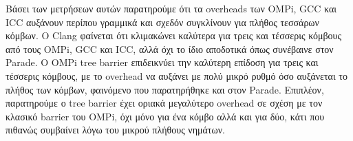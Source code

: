 Βάσει των μετρήσεων αυτών παρατηρούμε ότι τα overheads των OMPi, GCC και ICC αυξάνουν περίπου γραμμικά και σχεδόν συγκλίνουν για πλήθος τεσσάρων κόμβων. Ο Clang φαίνεται ότι κλιμακώνει καλύτερα για τρεις και τέσσερις κόμβους από τους OMPi, GCC και ICC, αλλά όχι το ίδιο αποδοτικά όπως συνέβαινε στον Parade. Ο OMPi tree barrier επιδεικνύει την καλύτερη επίδοση για τρεις και τέσσερις κόμβους, με το overhead να αυξάνει με πολύ μικρό ρυθμό όσο αυξάνεται το πλήθος των κόμβων, φαινόμενο που παρατηρήθηκε και στον Parade. Επιπλέον, παρατηρούμε ο tree barrier έχει οριακά μεγαλύτερο overhead σε σχέση με τον κλασικό barrier του OMPi, όχι μόνο για ένα κόμβο αλλά και για δύο, κάτι που πιθανώς συμβαίνει λόγω του μικρού πλήθους νημάτων.
